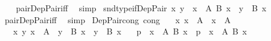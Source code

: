 \begin{isabellebody}
%
\isadelimproof
\ \ %
\endisadelimproof
%
\isatagproof
{}\isamarkupfalse%
\ pair{\isacharunderscore}{\kern0pt}Dep{\isacharunderscore}{\kern0pt}Pair{\isacharunderscore}{\kern0pt}iff\ \isamarkupfalse%
\ simp%
\endisatagproof
{\isafoldproof}%
%
\isadelimproof
\isanewline
%
\endisadelimproof
\isanewline
{}\isamarkupfalse%
\ snd{\isacharunderscore}{\kern0pt}type{\isacharunderscore}{\kern0pt}if{\isacharunderscore}{\kern0pt}Dep{\isacharunderscore}{\kern0pt}Pair{\isacharcolon}{\kern0pt}\ {\isachardoublequoteopen}{\isasymlangle}x{\isacharcomma}{\kern0pt}\ y{\isasymrangle}\ {\isacharcolon}{\kern0pt}\ {\isasymSum}x\ {\isacharcolon}{\kern0pt}\ A{\isachardot}{\kern0pt}\ {\isacharparenleft}{\kern0pt}B\ x{\isacharparenright}{\kern0pt}\ {\isasymLongrightarrow}\ y\ {\isacharcolon}{\kern0pt}\ B\ x{\isachardoublequoteclose}\isanewline
%
\isadelimproof
\ \ %
\endisadelimproof
%
\isatagproof
{}\isamarkupfalse%
\ pair{\isacharunderscore}{\kern0pt}Dep{\isacharunderscore}{\kern0pt}Pair{\isacharunderscore}{\kern0pt}iff\ \isamarkupfalse%
\ simp%
\endisatagproof
{\isafoldproof}%
%
\isadelimproof
\isanewline
%
\endisadelimproof
\isanewline
{}\isamarkupfalse%
\ Dep{\isacharunderscore}{\kern0pt}Pair{\isacharunderscore}{\kern0pt}cong\ {\isacharbrackleft}{\kern0pt}cong{\isacharbrackright}{\kern0pt}{\isacharcolon}{\kern0pt}\isanewline
\ \ \ {\isachardoublequoteopen}{\isasymAnd}x{\isachardot}{\kern0pt}\ x\ {\isacharcolon}{\kern0pt}\ A\ {\isasymlongleftrightarrow}\ x\ {\isacharcolon}{\kern0pt}\ A{\isacharprime}{\kern0pt}{\isachardoublequoteclose}\isanewline
\ \ \ {\isachardoublequoteopen}{\isasymAnd}x\ y{\isachardot}{\kern0pt}\ x\ {\isacharcolon}{\kern0pt}\ A{\isacharprime}{\kern0pt}\ {\isasymLongrightarrow}\ y\ {\isacharcolon}{\kern0pt}\ B\ x\ {\isasymlongleftrightarrow}\ y\ {\isacharcolon}{\kern0pt}\ B{\isacharprime}{\kern0pt}\ x{\isachardoublequoteclose}\isanewline
\ \ \ {\isachardoublequoteopen}{\isacharparenleft}{\kern0pt}p\ {\isacharcolon}{\kern0pt}\ {\isasymSum}x\ {\isacharcolon}{\kern0pt}\ A{\isachardot}{\kern0pt}\ {\isacharparenleft}{\kern0pt}B\ x{\isacharparenright}{\kern0pt}{\isacharparenright}{\kern0pt}\ {\isasymlongleftrightarrow}\ {\isacharparenleft}{\kern0pt}p\ {\isacharcolon}{\kern0pt}\ {\isasymSum}x\ {\isacharcolon}{\kern0pt}\ A{\isacharprime}{\kern0pt}{\isachardot}{\kern0pt}\ {\isacharparenleft}{\kern0pt}B{\isacharprime}{\kern0pt}\ x{\isacharparenright}{\kern0pt}{\isacharparenright}{\kern0pt}{\isachardoublequoteclose}\isanewline

\end{isabellebody}
